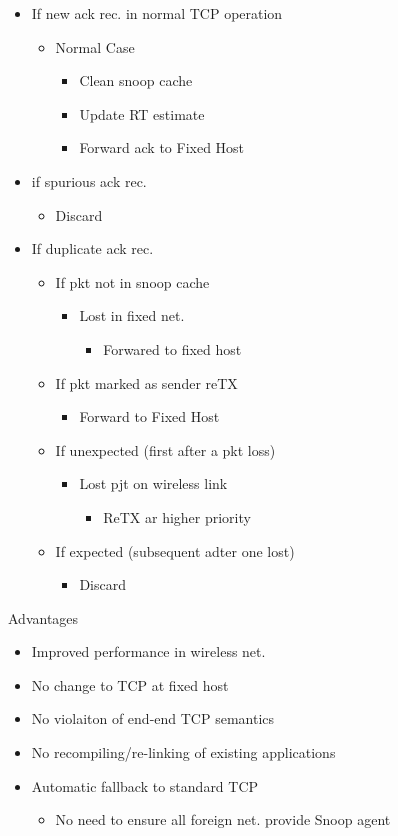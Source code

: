 \documentclass[a4paper]{article}
\begin{document}
\begin{itemize}
	\item If new ack rec. in normal TCP operation
	\begin{itemize}
		\item Normal Case
		\begin{itemize}
			\item Clean snoop cache
			\item Update RT estimate
			\item Forward ack to Fixed Host
		\end{itemize}
	\end{itemize}
	\item if spurious ack rec.
	\begin{itemize}
		\item Discard
	\end{itemize}
	\item If duplicate ack rec.
	\begin{itemize}
		\item If pkt not in snoop cache
		\begin{itemize}
			\item Lost in fixed net.
			\begin{itemize}
				\item Forwared to fixed host
			\end{itemize}
		\end{itemize}
		\item If pkt marked as sender reTX
		\begin{itemize}
			\item Forward to Fixed Host
		\end{itemize}
		\item If unexpected (first after a pkt loss)
		\begin{itemize}
			\item Lost pjt on wireless link
			\begin{itemize}
				\item ReTX ar higher priority
			\end{itemize}
		\end{itemize}
		\item If expected (subsequent adter one lost)
		\begin{itemize}
			\item Discard
		\end{itemize}
	\end{itemize}
\end{itemize}
Advantages
\begin{itemize}
	\item Improved performance in wireless net.
	\item No change to TCP at fixed host
	\item No violaiton of end-end TCP semantics
	\item No recompiling/re-linking of existing applications
	\item Automatic fallback to standard TCP
	\begin{itemize}
		\item No need to ensure all foreign net. provide Snoop agent
	\end{itemize}
\end{itemize}
\end{document}
